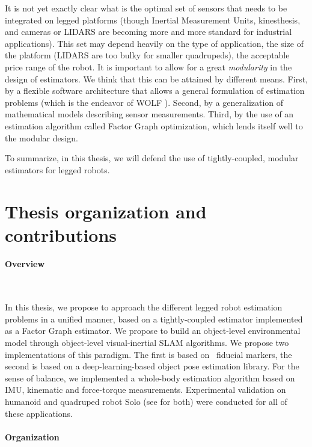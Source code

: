 It is not yet exactly clear what is the optimal set of sensors that needs to be integrated on legged platforms (though Inertial Measurement Units, kinesthesis, and 
cameras or LIDARS are becoming more and more standard for industrial applications). This set may depend heavily on the type of application,
the size of the platform (LIDARS are too bulky for smaller quadrupeds), the acceptable price range of the robot. It is important to allow
for a great \textit{modularity} in the design of estimators. We think that this can be attained by different means. First, by a flexible software architecture
that allows a general formulation of estimation problems (which is the endeavor of WOLF \cite{sola2021wolf}). Second, by a generalization of mathematical
models describing sensor measurements. Third, by the use of an estimation algorithm called Factor Graph optimization, which lends itself well to the modular design.

To summarize, in this thesis, we will defend the use of tightly-coupled, modular estimators for legged robots.


\section{Thesis organization and contributions}


\paragraph{Overview}~

In this thesis, we propose to approach the different legged robot estimation problems in a unified manner, based on a tightly-coupled estimator implemented as
a Factor Graph estimator.
We propose to build an object-level environmental model through object-level visual-inertial SLAM algorithms. We propose two implementations of this paradigm. 
The first is based on \apriltag\ fiducial markers, the second is based on a deep-learning-based object pose estimation library.   
For the sense of balance, we implemented a whole-body estimation algorithm based on IMU, kinematic and force-torque measurements.
Experimental validation on humanoid  and quadruped robot Solo (see  for both) were conducted for all of these applications.



\paragraph{Organization}~

